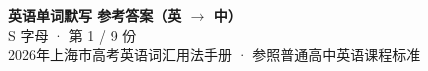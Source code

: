 \documentclass[10pt,a4paper]{article}
\begin{document}
\pagestyle{plain}

\begin{center}
{\LARGE\bfseries 英语单词默写 \quad 参考答案（英 $\to$ 中）}\\[0.22em]
{\large S 字母 · 第 1 / 9 份}\\[0.18em]
{\small 2026年上海市高考英语词汇用法手册 · 参照普通高中英语课程标准}
\end{center}

\vspace{0.2em}
\noindent{\color{rulegray}\rule{\textwidth}{0.8pt}}

\vspace{0.35em}

\vspace{0.25em}
\renewcommand{\arraystretch}{1.32}
\end{document}
